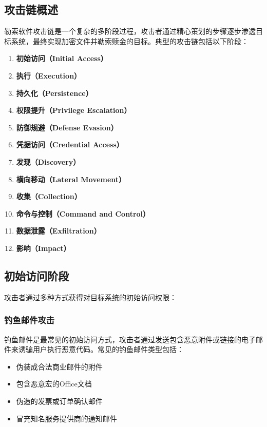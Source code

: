 \documentclass[12pt,a4paper]{article}
\begin{document}
\subsection{攻击链概述}

勒索软件攻击链是一个复杂的多阶段过程，攻击者通过精心策划的步骤逐步渗透目标系统，最终实现加密文件并勒索赎金的目标。典型的攻击链包括以下阶段：

\begin{enumerate}
    \item \textbf{初始访问（Initial Access）}
    \item \textbf{执行（Execution）}
    \item \textbf{持久化（Persistence）}
    \item \textbf{权限提升（Privilege Escalation）}
    \item \textbf{防御规避（Defense Evasion）}
    \item \textbf{凭据访问（Credential Access）}
    \item \textbf{发现（Discovery）}
    \item \textbf{横向移动（Lateral Movement）}
    \item \textbf{收集（Collection）}
    \item \textbf{命令与控制（Command and Control）}
    \item \textbf{数据泄露（Exfiltration）}
    \item \textbf{影响（Impact）}
\end{enumerate}

\subsection{初始访问阶段}

攻击者通过多种方式获得对目标系统的初始访问权限：

\subsubsection{钓鱼邮件攻击}
钓鱼邮件是最常见的初始访问方式，攻击者通过发送包含恶意附件或链接的电子邮件来诱骗用户执行恶意代码。常见的钓鱼邮件类型包括：
\begin{itemize}
    \item 伪装成合法商业邮件的附件
    \item 包含恶意宏的Office文档
    \item 伪造的发票或订单确认邮件
    \item 冒充知名服务提供商的通知邮件
\end{itemize}
\end{document}
